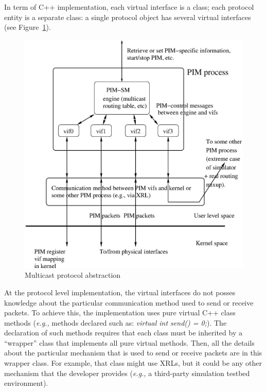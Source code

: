\documentclass[11pt]{article}
\newcommand{\eg}{\emph{e.g.,}\xspace}
\begin{document}
In term of C++ implementation, each virtual interface is a class; each
protocol entity is a separate class: a single protocol object has several
virtual interfaces (see Figure~\ref{fig:mcast_proto_abstraction}).

\begin{figure}[htbp]
  \begin{center}
    \includegraphics[width=5.0in]{figs/mcast_proto_abstraction}
    \caption{Multicast protocol abstraction}
    \label{fig:mcast_proto_abstraction}
  \end{center}
\end{figure}

At the protocol level implementation, the virtual interfaces do not
posses knowledge about the particular communication method used to send
or receive packets. To achieve this, the implementation uses pure
virtual C++ class methods (\eg methods declared such as:
{\it virtual int send() = 0;}).
The declaration of such methods requires that each class must be
inherited by a ``wrapper'' class that implements all pure virtual
methods. Then, all the details about the particular mechanism
that is used to send or receive packets are in this wrapper class.
For example, that class might use XRLs, but it could be any other
mechanism that the developer provides (\eg a third-party simulation
testbed environment).
\end{document}
